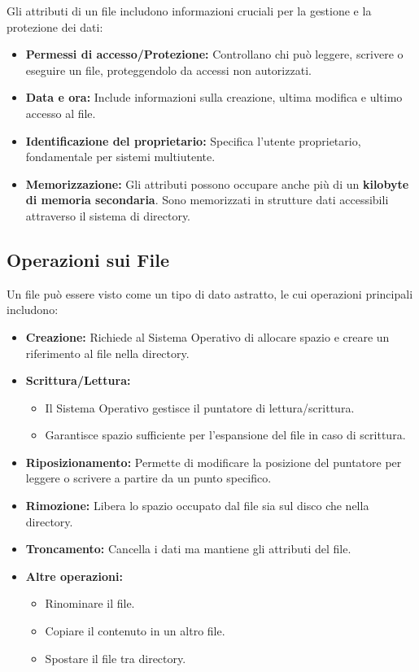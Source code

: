 Gli attributi di un file includono informazioni cruciali per la gestione e la protezione dei dati:

\begin{itemize}
    \item \textbf{Permessi di accesso/Protezione:} Controllano chi può leggere, scrivere o eseguire un file, proteggendolo da accessi non autorizzati.
    \item \textbf{Data e ora:} Include informazioni sulla creazione, ultima modifica e ultimo accesso al file.
    \item \textbf{Identificazione del proprietario:} Specifica l'utente proprietario, fondamentale per sistemi multiutente.
    \item \textbf{Memorizzazione:} Gli attributi possono occupare anche più di un \textbf{kilobyte di memoria secondaria}. Sono memorizzati in strutture dati accessibili attraverso il sistema di directory.
\end{itemize}

\subsection{Operazioni sui File}

Un file può essere visto come un tipo di dato astratto, le cui operazioni principali includono:

\begin{itemize}
    \item \textbf{Creazione:} Richiede al Sistema Operativo di allocare spazio e creare un riferimento al file nella directory.
    \item \textbf{Scrittura/Lettura:}
    \begin{itemize}
        \item Il Sistema Operativo gestisce il puntatore di lettura/scrittura.
        \item Garantisce spazio sufficiente per l'espansione del file in caso di scrittura.
    \end{itemize}
    \item \textbf{Riposizionamento:} Permette di modificare la posizione del puntatore per leggere o scrivere a partire da un punto specifico.
    \item \textbf{Rimozione:} Libera lo spazio occupato dal file sia sul disco che nella directory.
    \item \textbf{Troncamento:} Cancella i dati ma mantiene gli attributi del file.
    \item \textbf{Altre operazioni:}
    \begin{itemize}
        \item Rinominare il file.
        \item Copiare il contenuto in un altro file.
        \item Spostare il file tra directory.
    \end{itemize}
\end{itemize}

